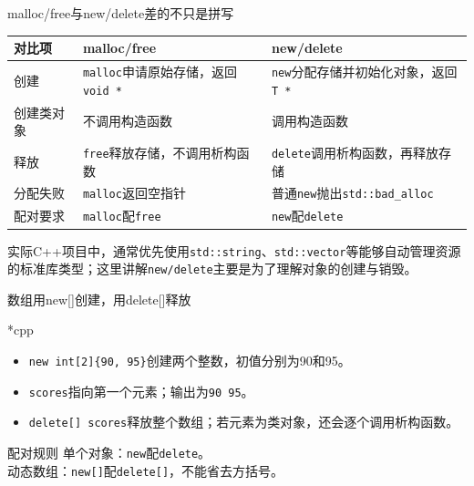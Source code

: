 \begin{frame}{malloc/free与new/delete差的不只是拼写}
    \renewcommand{\arraystretch}{1.25}
    \begin{tabular}{p{}>{\raggedright\arraybackslash}p{}>{\raggedright\arraybackslash}p{}}
        \textbf{对比项} & \textbf{malloc/free} & \textbf{new/delete}\\
        \hline
        创建 & \texttt{malloc}申请原始存储，\newline 返回\mbox{\texttt{void *}} & \texttt{new}分配存储并初始化对象，\newline 返回\mbox{\texttt{T *}}\\
        创建类对象 & 不调用构造函数 & 调用构造函数\\
        释放 & \texttt{free}释放存储，\newline 不调用析构函数 & \texttt{delete}调用析构函数，\newline 再释放存储\\
        分配失败 & \texttt{malloc}返回空指针 & 普通\texttt{new}抛出\texttt{std::bad\_alloc}\\
        配对要求 & \texttt{malloc}配\texttt{free} & \texttt{new}配\texttt{delete}
    \end{tabular}
    \par\medskip
    \small 实际C++项目中，通常优先使用\texttt{std::string}、\texttt{std::vector}等能够自动管理资源的标准库类型；这里讲解\texttt{new/delete}主要是为了理解对象的创建与销毁。
\end{frame}

\begin{frame}{数组用new[]创建，用delete[]释放}
    \begin{Code}*{cpp}
        
    \end{Code}
    \begin{itemize}
        \item \texttt{new int[2]\{90, 95\}}创建两个整数，初值分别为90和95。
        \item \texttt{scores}指向第一个元素；输出为\texttt{90 95}。
        \item \texttt{delete[] scores}释放整个数组；若元素为类对象，还会逐个调用析构函数。
    \end{itemize}
    \medskip
    \begin{vspquotered}{配对规则}
        单个对象：\texttt{new}配\texttt{delete}。\\[5pt]
        动态数组：\texttt{new[]}配\texttt{delete[]}，不能省去方括号。
    \end{vspquotered}
\end{frame}
